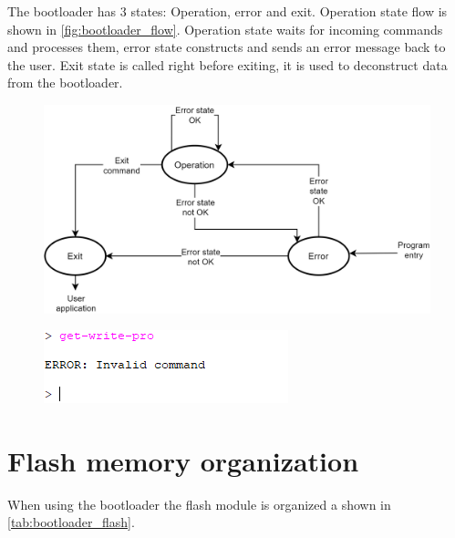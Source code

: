 The bootloader has 3 states: Operation, error and exit. Operation state flow is shown in \autoref{fig:bootloader_flow}. Operation state waits for incoming commands and processes them, error state constructs and sends an error message back to the user. Exit state is called right before exiting, it is used to deconstruct data from the bootloader.



\begin{figure}[H]
    \centering
    \includegraphics[width=.8\linewidth]{images/bootloader_flow.png}
    \label{fig:bootloader_flow}
\end{figure}

\begin{figure}[H]
    \centering
    \includegraphics[width=.4\linewidth]{images/bootloader_cmd_err.png}
    \label{fig:bootloader_cmd_err}
\end{figure}

\section{Flash memory organization}

When using the bootloader the flash module is organized a shown in \autoref{tab:bootloader_flash}. 

